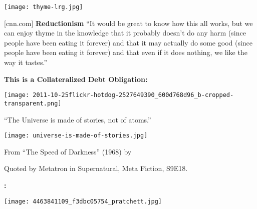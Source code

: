 \begin{marginfigure}[]
\texttt{[image: thyme-lrg.jpg]}\\
\end{marginfigure}

    {\mbox{} \hfill \tiny [cnn.com]}
  \textbf{Reductionism}
  ``It would be great to know how this all works, but  we
  can enjoy thyme in the knowledge that it probably doesn't do any harm
  (since people have been eating it forever) and that it may actually do
  some good (since people have been eating it forever) and that even if
  it does nothing, we like the way it tastes.''

  \bigskip

  {
  }
\textbf{This is a Collateralized Debt Obligation:}

  
\begin{marginfigure}[]
\texttt{[image: 2011-10-25flickr-hotdog-2527649390\_600d768d96\_b-cropped-transparent.png]}
\end{marginfigure}


  \begin{center}
     
    ``The Universe is made of stories, not of atoms.''
    
\begin{marginfigure}[]
\texttt{[image: universe-is-made-of-stories.jpg]}
\end{marginfigure}

    
      From ``The Speed of Darkness'' (1968) by
    
      Quoted by Metatron in Supernatural, Meta Fiction, S9E18.
    
  \end{center}
  \textbf{
    :
  }
    
    
\begin{marginfigure}[]
\texttt{[image: 4463841109\_f3dbc05754\_pratchett.jpg]}
\end{marginfigure}

